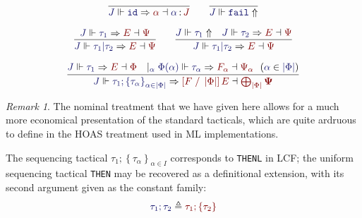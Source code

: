 \documentclass[11pt]{article}
\theoremstyle{definition}
\theoremstyle{remark}
\newtheorem{remark}[thm]{Remark}
\numberwithin{equation}{section}
\def\IModeColorName{MidnightBlue}
\def\OModeColorName{Maroon}
\newcommand\IMode[1]{{\color{\IModeColorName}{#1}}}
\newcommand\OMode[1]{{\color{\OModeColorName}{#1}}}
\newcommand\HypJ[2]{#1\ \ (#2)}
\newcommand\GenJ[2]{\vert_{\IMode{#1}}\; #2}
\newcommand\JJ{J}
\newcommand\MkSet[1]{\left\{#1\right\}}
\newcommand\MkFam[3]{\MkSet{#1_{#2}}_{#2\in #3}}
\newcommand\OSG[2]{\IMode{#1}\,{\color{Black}:}\,\OMode{#2}}
\newcommand\Refine[4]{\IMode{#1}\Vdash\IMode{#2}\Rightarrow\OMode{#4}\dashv\OMode{#3}}
\newcommand\NoRefine[2]{\IMode{#1}\Vdash\IMode{#2}\Uparrow}
\newcommand\Member[2]{\IMode{#1}\in\IMode{#2}}
\newcommand\IdTac{\mathtt{id}}
\newcommand\FailTac{\mathtt{fail}}
\newcommand\OrElseTac[2]{#1\vert#2}
\newcommand\ThenTac[2]{#1;#2}
\newcommand\Dom[1]{\left\vert#1\right\vert}
\newcommand\Subst[3]{\left[#1\;/\;#2\right]#3}
\begin{document}
\begin{gather*}
  \infer{
    \Refine{\JJ}{\IdTac}{\OSG{\alpha}{\JJ}}{\alpha}
  }{
  }
  \qquad
  \infer{
    \NoRefine{\JJ}{\FailTac}
  }{
  }\\[6pt]
  \infer{
    \Refine{\JJ}{\OrElseTac{\tau_1}{\tau_2}}{\Psi}{E}
  }{
    \Refine{\JJ}{\tau_1}{\Psi}{E}
  }
  \qquad
  \infer{
    \Refine{\JJ}{\OrElseTac{\tau_1}{\tau_2}}{\Psi}{E}
  }{
    \NoRefine{\JJ}{\tau_1} &
    \Refine{\JJ}{\tau_2}{\Psi}{E}
  }\\[6pt]
  \infer{
    \Refine{\JJ}{\ThenTac{\tau_1}{\MkFam{\tau}{\alpha}{\Dom\Phi}}}{\bigoplus_{\Dom\Phi}\mathbf\Psi}{\Subst{F}{\Dom\Phi}{E}}
  }{
    \Refine{\JJ}{\tau_1}{\Phi}{E} &
    \GenJ{\alpha}{
      \HypJ{
        \Refine{\Phi(\alpha)}{\tau_\alpha}{\Psi_\alpha}{F_\alpha}
      }{
        \Member{\alpha}{\Dom\Phi}
      }
    }
  }
\end{gather*}

\begin{remark}
  The nominal treatment that we have given here allows for a much more
  economical presentation of the standard tacticals, which are quite ardruous
  to define in the HOAS treatment used in ML implementations.
\end{remark}

The sequencing tactical
$\ThenTac{\tau_1}{\MkFam{\tau}{\alpha}{I}}$ corresponds to
\verb!THENL! in LCF; the uniform sequencing tactical \verb!THEN! may be
recovered as a definitional extension, with its second argument given as the
constant family:
\[
    \IMode{\ThenTac{\tau_1}{\tau_2}}
    \triangleq
    \OMode{\ThenTac{\tau_1}{\MkSet{\tau_2}}}
\]
\end{document}
